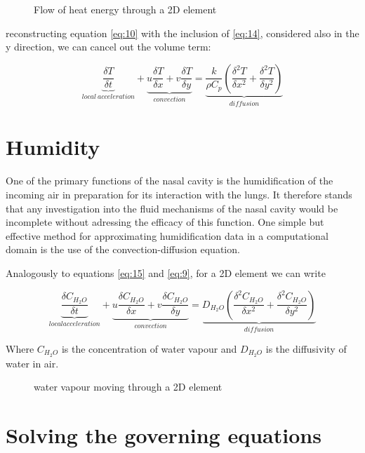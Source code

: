     \begin{figure} \label{fig:eneq}
      \caption{Flow of heat energy through a 2D element}
    \end{figure}

    reconstructing equation \ref{eq:10} with the inclusion of \ref{eq:14}, considered also in the y direction, we can cancel out the volume term:

    \begin{equation} \label{eq:15}
      \underbrace{\frac{\delta T}{\delta t}}_{local\ acceleration} + \underbrace{u \frac{\delta T}{\delta x} + v \frac{\delta T}{\delta y}}_{convection} = \underbrace{\frac{k}{\rho C_{p}} ( \frac{\delta^2 T}{\delta x^2} + \frac{\delta^2 T}{\delta y^2} )}_{diffusion}
    \end{equation}

\section{Humidity}

One of the primary functions of the nasal cavity is the humidification of the incoming air in preparation for its interaction with the lungs. It therefore stands that any investigation into the fluid mechanisms of the nasal cavity would be incomplete without adressing the efficacy of this function. One simple but effective method for approximating humidification data in a computational domain is the use of the convection-diffusion equation.

Analogously to equations \ref{eq:15} and \ref{eq:9}, for a 2D element we can write

\begin{equation} \label{eq:16}
  \underbrace{\frac{\delta C_{H_{2} O}}{\delta t}}_{local acceleration} + \underbrace{u \frac{\delta C_{H_{2} O}}{\delta x} + v \frac{\delta C_{H_{2} O}}{\delta y}}_{convection} = \underbrace{D_{H_{2} O} ( \frac{\delta^2 C_{H_{2} O}}{\delta x^2} + \frac{\delta^2 C_{H_{2} O}}{\delta y^2} )}_{diffusion}
\end{equation} \nocite{Naftali1998}

Where $C_{H_{2} O}$ is the concentration of water vapour and $D_{H_{2} O}$ is the diffusivity of water in air.

\begin{figure} \label{fig:h2oel}
  \caption{water vapour moving through a 2D element}
\end{figure}

\section{Solving the governing equations}

